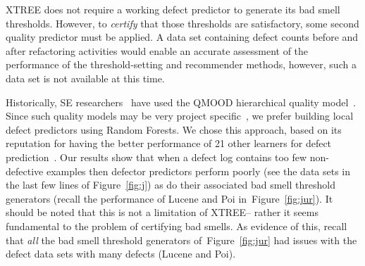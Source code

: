 \documentclass[twocolumn,5p]{elsarticle}
\newcommand{\fig}[1]{Figure~\ref{fig:#1}}
\theoremstyle{break}
\begin{document}
\begin{itemize}
{XTREE does not require a working defect predictor to generate
its bad smell thresholds. However, to {\em certify}
that those thresholds are satisfactory, some
second quality predictor must be applied. A data set containing defect counts before and after refactoring activities would enable an accurate assessment of the performance of the threshold-setting and recommender methods, however, such a data set is not available at this time.

 Historically,
SE researchers~\cite{Cheng10,OKeeffe08,OKeeffe07,Moghadam2011,Mkaouer14} have used the QMOOD hierarchical quality model~\cite{Bansiya02}.
Since such quality models may be very project specific~\cite{localvsglobal}, we prefer building local 
defect predictors using Random Forests. We chose this approach,  based on its reputation for having the better  performance of 21 other learners for defect prediction~\cite{lessmann}.  
Our results show that when a defect log contains too few
non-defective examples then defector predictors
perform poorly (see the data sets in the last few lines of \fig{j})
as do their associated bad smell threshold generators
(recall the performance of Lucene and Poi in~\fig{jur}). It should be noted that this is not a limitation of XTREE-- rather
it seems fundamental to the problem of certifying bad smells.
As evidence of this, recall that {\em all} the bad smell threshold generators of~\fig{jur}
had issues with the defect data sets with  many defects
(Lucene and Poi).



  








}
\end{itemize}
\end{document}
